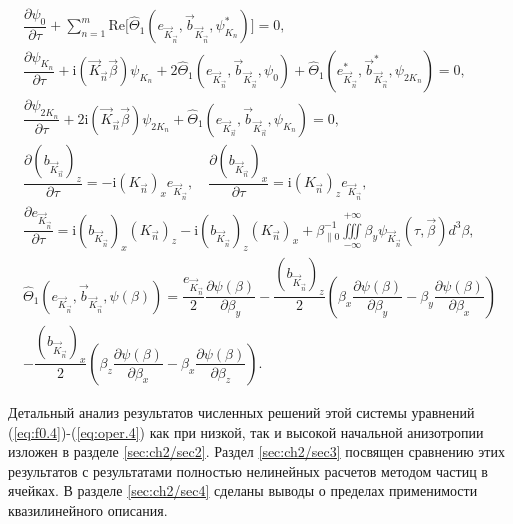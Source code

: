 \begin{align}
\label{eq:f0.4}
\dfrac{\partial \psi_0}{\partial \tau}+\sum\limits^{m}_{n=1}\mathrm{Re}\Bigg[\hat \Theta_1\left(e_{\vec{K}_{\vec{n}}},{\vec{b}}_{\vec{K}_{\vec{n}}},\psi_{K_n}^*\right)\Bigg]=0,\\
\label{eq:f1.4}
\dfrac{\partial \psi_{K_n}}{\partial \tau}+\mathrm{i}\left(\overrightarrow{K}_{\vec{n}}\overrightarrow{\beta}\right)\psi_{K_n}+2\hat \Theta_1\left(e_{\vec{K}_{\vec{n}}},{\vec{b}}_{\vec{K}_{\vec{n}}},\psi_{0}\right)+\hat \Theta_1\left(e_{\vec{K}_{\vec{n}}}^*,{\vec{b}}_{\vec{K}_{\vec{n}}}^*,\psi_{2K_n}\right)=0,\\
\label{eq:f2.4}
\dfrac{\partial \psi_{2K_n}}{\partial \tau}+2\mathrm{i}\left(\overrightarrow{K}_{\vec{n}}\overrightarrow{\beta}\right)\psi_{2K_n}+\hat \Theta_1\left(e_{\vec{K}_{\vec{n}}},{\vec{b}}_{\vec{K}_{\vec{n}}},\psi_{K_n}\right)=0,\\
    \dfrac{\partial \left({b}_{\vec{K}_{\vec{n}}}\right)_z}{\partial \tau}=-\mathrm{i}\left(K_{\vec{n}}\right)_xe_{\vec{K}_{\vec{n}}},\quad 
    \dfrac{\partial \left({b}_{\vec{K}_{\vec{n}}}\right)_x}{\partial \tau}=\mathrm{i}\left(K_{\vec{n}}\right)_ze_{\vec{K}_{\vec{n}}}, \\
\label{eq:maxw3.3}
\dfrac{\partial e_{\vec{K}_{\vec{n}}}}{\partial \tau}=\mathrm{i}\left({b}_{\vec{K}_{\vec{n}}}\right)_x\left(K_{\vec{n}}\right)_z-\mathrm{i}\left({b}_{\vec{K}_{\vec{n}}}\right)_z\left(K_{\vec{n}}\right)_x+\beta_{\|0}^{-1}{\iiint\limits^{+\infty}_{-\infty}\beta_y\psi_{\vec{K}_{\vec{n}}}(\tau,\overrightarrow{\beta})d^3\beta} ,\\
\label{eq:oper.4}
\hat \Theta_1\left(e_{\vec{K}_{\vec{n}}},{\vec{b}}_{\vec{K}_{\vec{n}}},\psi(\beta)\right)  =  \dfrac{e_{\vec{K}_{\vec{n}}}}{2}\dfrac{\partial \psi(\beta)}{\partial \beta_y}-\dfrac{\left({b}_{\vec{K}_{\vec{n}}}\right)_z}{2} \left(\beta_x\dfrac{\partial \psi(\beta)}{\partial \beta_y}-\beta_y\dfrac{\partial \psi(\beta)}{\partial \beta_x}\right) \nonumber \\
-\dfrac{\left({b}_{\vec{K}_{\vec{n}}}\right)_x}{2} \left(\beta_z\dfrac{\partial \psi(\beta)}{\partial \beta_x}-\beta_x\dfrac{\partial \psi(\beta)}{\partial \beta_z}\right) .
\end{align}

Детальный анализ результатов численных решений этой системы уравнений (\ref{eq:f0.4})-(\ref{eq:oper.4}) как при низкой, так и высокой начальной анизотропии изложен в разделе \ref{sec:ch2/sec2}.
Раздел \ref{sec:ch2/sec3} посвящен сравнению этих результатов с результатами полностью нелинейных расчетов методом частиц в ячейках. 
В разделе \ref{sec:ch2/sec4} сделаны выводы о пределах применимости квазилинейного описания.


